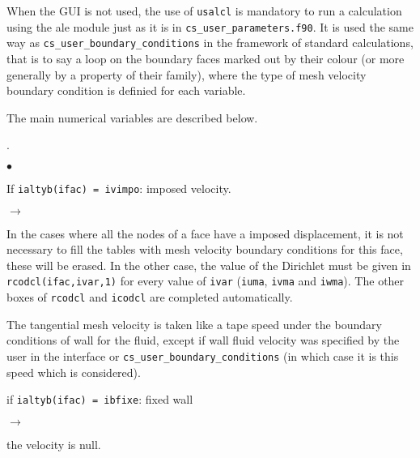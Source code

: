 {{{
When the GUI is not used, the use of \texttt{usalcl} is mandatory to run
a calculation using
the ale module just as it is in \texttt{cs\_user\_parameters.f90}. It is used the same way as
\texttt{cs\_user\_boundary\_conditions} in the framework of
standard calculations, that is to say a loop on the boundary faces
marked out by their colour (or more generally by a property of their
family), where the type of mesh velocity boundary condition is definied for
each variable.

The main numerical variables are described below.

.

\begin{list}{$\bullet$}{}

\item If \texttt{ialtyb(ifac) = ivimpo}: imposed velocity.

\begin{list}{$\rightarrow$}{}
\item In the cases where all the nodes of a face have a imposed displacement,
 it is not necessary to fill the tables with mesh velocity boundary conditions
 for this face, these will be erased. In the other case,
 the value of the Dirichlet must be given in \texttt{rcodcl(ifac,ivar,1)} for
 every value of \texttt{ivar} (\texttt{iuma}, \texttt{ivma} and \texttt{iwma}).
 The other boxes of \texttt{rcodcl} and \texttt{icodcl} are completed automatically.

 The tangential mesh velocity is taken like a tape speed under the
 boundary conditions of wall for the fluid, except if wall fluid velocity
 was specified by the user in the interface or \texttt{cs\_user\_boundary\_conditions} (in which case
 it is this speed which is considered).
\end{list}

 \item if \texttt{ialtyb(ifac) = ibfixe}: fixed wall
\begin{list}{$\rightarrow$}{}
 \item the velocity is null.
\end{list}


\end{list}}}}
